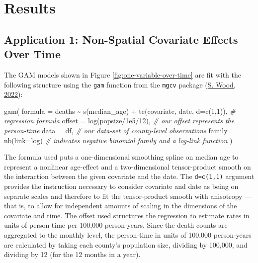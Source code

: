 \documentclass[
]{article}
\newenvironment{Shaded}{\begin{snugshade}}{\end{snugshade}}
\newcommand{\AttributeTok}[1]{\textcolor[rgb]{0.77,0.63,0.00}{#1}}
\newcommand{\CommentTok}[1]{\textcolor[rgb]{0.56,0.35,0.01}{\textit{#1}}}
\newcommand{\DecValTok}[1]{\textcolor[rgb]{0.00,0.00,0.81}{#1}}
\newcommand{\FloatTok}[1]{\textcolor[rgb]{0.00,0.00,0.81}{#1}}
\newcommand{\FunctionTok}[1]{\textcolor[rgb]{0.00,0.00,0.00}{#1}}
\newcommand{\NormalTok}[1]{#1}
\newcommand{\SpecialCharTok}[1]{\textcolor[rgb]{0.00,0.00,0.00}{#1}}
\newcommand{\StringTok}[1]{\textcolor[rgb]{0.31,0.60,0.02}{#1}}
\begin{document}
\hypertarget{results}{%
\section{Results}\label{results}}

\hypertarget{application-1-non-spatial-covariate-effects-over-time}{%
\subsection{Application 1: Non-Spatial Covariate Effects Over Time}\label{application-1-non-spatial-covariate-effects-over-time}}

The GAM models shown in Figure \ref{fig:one-variable-over-time} are fit with the following structure using
the \texttt{gam} function from the \texttt{mgcv} package (\protect\hyperlink{ref-wood_mgcv_2022}{S. Wood, 2022}):

\begin{Shaded}
\begin{Highlighting}[]
\FunctionTok{gam}\NormalTok{(}
  \AttributeTok{formula =}\NormalTok{ deaths }\SpecialCharTok{\textasciitilde{}} \FunctionTok{s}\NormalTok{(median\_age) }\SpecialCharTok{+} \FunctionTok{te}\NormalTok{(covariate, date, }\AttributeTok{d=}\FunctionTok{c}\NormalTok{(}\DecValTok{1}\NormalTok{,}\DecValTok{1}\NormalTok{)), }\CommentTok{\# regression formula}
  \AttributeTok{offset =} \FunctionTok{log}\NormalTok{(popsize}\SpecialCharTok{/}\FloatTok{1e5}\SpecialCharTok{/}\DecValTok{12}\NormalTok{), }\CommentTok{\# our offset represents the person{-}time}
  \AttributeTok{data =}\NormalTok{ df,     }\CommentTok{\# our data{-}set of county{-}level observations}
  \AttributeTok{family =} \FunctionTok{nb}\NormalTok{(}\AttributeTok{link=}\StringTok{\textquotesingle{}log\textquotesingle{}}\NormalTok{)  }\CommentTok{\# indicates negative binomial family and a log{-}link function}
\NormalTok{)}
\end{Highlighting}
\end{Shaded}

The formula used puts a one-dimensional smoothing spline on median age to represent a
nonlinear age-effect and a two-dimensional tensor-product smooth on the
interaction between the given covariate and the date. The \texttt{d=c(1,1)} argument
provides the instruction necessary to consider covariate and date as being on
separate scales and therefore to fit the tensor-product smooth with anisotropy ---
that is, to allow for independent amounts of scaling in the dimensions of the
covariate and time. The offset used structures the regression to estimate rates
in units of person-time per 100,000 person-years. Since the death counts are
aggregated to the monthly level, the person-time in units of 100,000
person-years are calculated by taking each county's population size, dividing by
100,000, and dividing by 12 (for the 12 months in a year).
\end{document}

